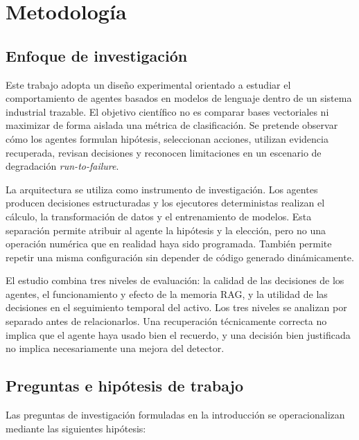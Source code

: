 \chapter{Metodología}

\section{Enfoque de investigación}

Este trabajo adopta un diseño experimental orientado a estudiar el
comportamiento de agentes basados en modelos de lenguaje dentro de un sistema
industrial trazable. El objetivo científico no es comparar bases vectoriales ni
maximizar de forma aislada una métrica de clasificación. Se pretende observar
cómo los agentes formulan hipótesis, seleccionan acciones, utilizan evidencia
recuperada, revisan decisiones y reconocen limitaciones en un escenario de
degradación \textit{run-to-failure}.

La arquitectura se utiliza como instrumento de investigación. Los agentes
producen decisiones estructuradas y los ejecutores deterministas realizan el
cálculo, la transformación de datos y el entrenamiento de modelos. Esta
separación permite atribuir al agente la hipótesis y la elección, pero no una
operación numérica que en realidad haya sido programada. También permite repetir
una misma configuración sin depender de código generado dinámicamente.

El estudio combina tres niveles de evaluación: la calidad de las decisiones de
los agentes, el funcionamiento y efecto de la memoria RAG, y la utilidad de las
decisiones en el seguimiento temporal del activo. Los tres niveles se analizan
por separado antes de relacionarlos. Una recuperación técnicamente correcta no
implica que el agente haya usado bien el recuerdo, y una decisión bien
justificada no implica necesariamente una mejora del detector.

\section{Preguntas e hipótesis de trabajo}

Las preguntas de investigación formuladas en la introducción se
operacionalizan mediante las siguientes hipótesis:

